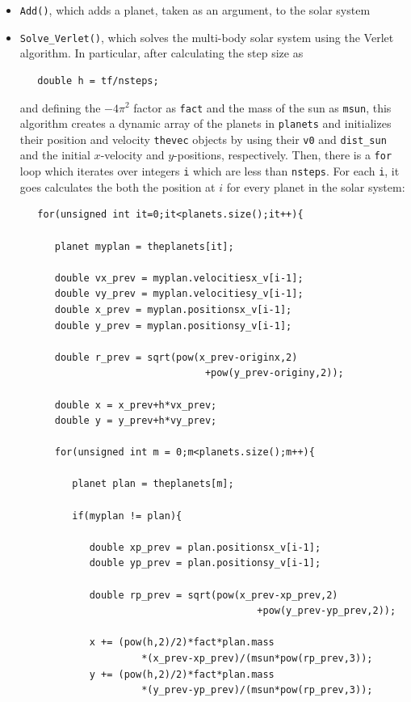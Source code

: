 \documentclass[12pt]{article}
\numberwithin{equation}{section}
\begin{document}
\begin{itemize}

\item \texttt{Add()}, which adds a planet, taken as an argument, to the solar system
\item \texttt{Solve\_Verlet()}, which solves the multi-body solar system using the Verlet algorithm.  In particular, after calculating the step size as

\begin{verbatim}
   double h = tf/nsteps;
\end{verbatim}

and defining the $-4\pi^{2}$ factor as \texttt{fact} and the mass of the sun as \texttt{msun}, this algorithm creates a dynamic array of the planets in \texttt{planets} and initializes their position and velocity \texttt{thevec} objects by using their \texttt{v0} and \texttt{dist\_sun} and the initial $x$-velocity and $y$-positions, respectively.  Then, there is a \texttt{for} loop which iterates over integers \texttt{i} which are less than \texttt{nsteps}.  For each \texttt{i}, it goes calculates the both the position at $i$ for every planet in the solar system:

\begin{verbatim}
   for(unsigned int it=0;it<planets.size();it++){
       
      planet myplan = theplanets[it];

      double vx_prev = myplan.velocitiesx_v[i-1];
      double vy_prev = myplan.velocitiesy_v[i-1];
      double x_prev = myplan.positionsx_v[i-1];
      double y_prev = myplan.positionsy_v[i-1];
      
      double r_prev = sqrt(pow(x_prev-originx,2)
                                +pow(y_prev-originy,2));
      
      double x = x_prev+h*vx_prev;
      double y = y_prev+h*vy_prev;
      
      for(unsigned int m = 0;m<planets.size();m++){
	
         planet plan = theplanets[m];
	
         if(myplan != plan){
	  
            double xp_prev = plan.positionsx_v[i-1];
            double yp_prev = plan.positionsy_v[i-1];
  
            double rp_prev = sqrt(pow(x_prev-xp_prev,2)
                                         +pow(y_prev-yp_prev,2));
  
            x += (pow(h,2)/2)*fact*plan.mass
                     *(x_prev-xp_prev)/(msun*pow(rp_prev,3));
            y += (pow(h,2)/2)*fact*plan.mass
                     *(y_prev-yp_prev)/(msun*pow(rp_prev,3));
	  

\end{verbatim}
\end{itemize}
\end{document}
